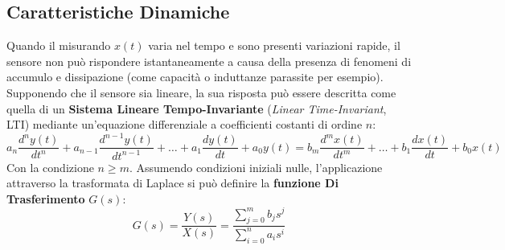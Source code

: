 ﻿\documentclass[11pt, a4paper]{article}
\begin{document}
\subsection{Caratteristiche Dinamiche}
Quando il misurando $x(t)$ varia nel tempo e sono presenti variazioni rapide, il sensore non può rispondere istantaneamente a causa della presenza di fenomeni di accumulo e dissipazione (come capacità o induttanze parassite per esempio). Supponendo che il sensore sia lineare, la sua risposta può essere descritta come quella di un \textbf{Sistema Lineare Tempo-Invariante} (\textit{Linear Time-Invariant}, LTI) mediante un'equazione differenziale a coefficienti costanti di ordine $n$:
\[
    a_n \frac{d^n y(t)}{dt^n} + a_{n-1} \frac{d^{n-1} y(t)}{dt^{n-1}} + \dots + a_1 \frac{dy(t)}{dt} + a_0 y(t) = b_m \frac{d^m x(t)}{dt^m} + \dots + b_1 \frac{dx(t)}{dt} + b_0 x(t)
\]
Con la condizione $n \ge m$. Assumendo condizioni iniziali nulle, l'applicazione attraverso la trasformata di Laplace si può definire la \textbf{funzione Di Trasferimento} $G(s)$:
\[
    G(s) = \frac{Y(s)}{X(s)} = \frac{\sum_{j=0}^m b_j s^j}{\sum_{i=0}^n a_i s^i}
\]
\end{document}
